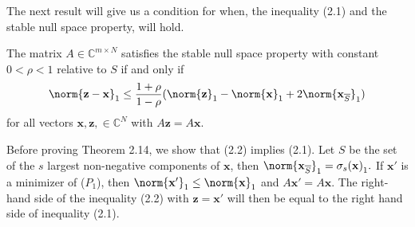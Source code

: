 The next result will give us a condition for when, the inequality (2.1) and the stable null space property, will hold.

\begin{tcolorbox}[colback=yellow,colframe=white]
\begin{theorem}
The matrix $A \in \mathbb{C}^{m \times N}$ satisfies the stable null space property with constant $0 < \rho < 1$ relative to $S$ if and only if
\begin{equation}
\norm{\mathbf{z-x}}_{1} \leq \frac{1 + \rho}{1 - \rho}(\norm{\mathbf{z}}_1-\norm{\mathbf{x}}_1+2 \norm{\mathbf{x}_{\overline{S}}}_{1})
\end{equation}
for all vectors $\mathbf{x,z}, \in \mathbb{C}^N$ with $A\mathbf{z} = A\mathbf{x}$. 
\end{theorem}
\end{tcolorbox}


Before proving Theorem 2.14, we show that (2.2) implies (2.1). Let $S$ be the set of the $s$ largest non-negative components of $\mathbf{x}$, then $\norm{\mathbf{x}_{\overline{S}}}_1 = \sigma_s \mathbf{(x)}_1 .$
If $\mathbf{x'}$ is a minimizer of ($P_1$), then $\norm{\mathbf{x'}}_1 \leq \norm{\mathbf{x}}_1$ and $A\mathbf{x'} = A\mathbf{x}$. The right-hand side of the inequality (2.2) with $\mathbf{z = x'}$ will then be equal to the right hand side of inequality (2.1). 

